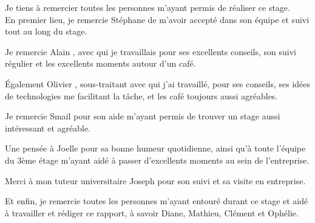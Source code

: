 Je tiens à remercier toutes les personnes m'ayant permis de réaliser ce stage.\\

En premier lieu, je remercie Stéphane  de m'avoir accepté dans son équipe et suivi tout au long du stage.

Je remercie Alain , avec qui je travaillais pour ses excellents conseils, son suivi régulier et les excellents moments autour d'un café.

\'Egalement Olivier , sous-traitant avec qui j'ai travaillé, pour ses conseils, ses idées de technologies me facilitant la tâche, et les café toujours aussi agréables.

Je remercie Smail  pour son aide m'ayant permis de trouver un stage aussi intéressant et agréable.

Une pensée à Joelle  pour sa bonne humeur quotidienne, ainsi qu'à toute l'équipe du 3ème étage m'ayant aidé à passer d'excellents moments au sein de l'entreprise.

Merci à mon tuteur universitaire Joseph  pour son suivi et sa visite en entreprise.

Et enfin, je remercie toutes les personnes m'ayant entouré durant ce stage et aidé à travailler et rédiger ce rapport, à savoir Diane, Mathieu, Clément et Ophélie.
